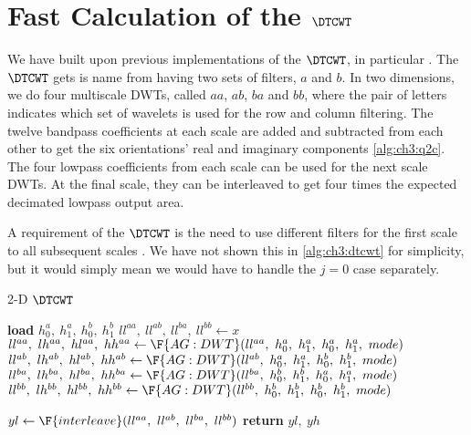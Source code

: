\section{Fast Calculation of the $\DTCWT$}\label{sec:ch3:dtcwt}
We have built upon previous implementations of the $\DTCWT$, in particular
\cite{kingsbury_dtcwt_2003, cai_2-d_2011, wareham_dtcwt_2014}. The $\DTCWT$ gets
is name from having two sets of filters, $a$ and $b$. In two dimensions, we do
four multiscale DWTs, called $aa$, $ab$, $ba$ and $bb$, where the pair of letters indicates
which set of wavelets is used for the row and column filtering. The twelve
bandpass coefficients at each scale are added and subtracted from each other to
get the six orientations' real and imaginary components \autoref{alg:ch3:q2c}.
The four lowpass coefficients from each scale can be used for the next scale
DWTs. At the final scale, they can be interleaved to get four times the expected
decimated lowpass output area.

A requirement of the $\DTCWT$ is the need to use different filters for the first
scale to all subsequent scales \cite{selesnick_dual-tree_2005}. We have not
shown this in \autoref{alg:ch3:dtcwt} for simplicity, but it would simply mean
we would have to handle the $j=0$ case separately.

\begin{algorithm}[tb]
\caption{2-D $\DTCWT$}\label{alg:ch3:dtcwt}
\begin{algorithmic}[1]
\State \textbf{load} $h_0^a,\ h_1^a,\ h_0^b,\ h_1^b$
\State $ll^{aa},\ ll^{ab},\ ll^{ba},\ ll^{bb} \gets x$
  \State $ll^{aa},\ lh^{aa},\ hl^{aa},\ hh^{aa} \gets \F{AG:DWT}(ll^{aa},\ h_0^a,\ h_1^a,\ h_0^a,\ h_1^a,\ mode)$
  \State $ll^{ab},\ lh^{ab},\ hl^{ab},\ hh^{ab} \gets \F{AG:DWT}(ll^{ab},\ h_0^a,\ h_1^a,\ h_0^b,\ h_1^b,\ mode)$
  \State $ll^{ba},\ lh^{ba},\ hl^{ba},\ hh^{ba} \gets \F{AG:DWT}(ll^{ba},\ h_0^b,\ h_1^b,\ h_0^a,\ h_1^a,\ mode)$
  \State $ll^{bb},\ lh^{bb},\ hl^{bb},\ hh^{bb} \gets \F{AG:DWT}(ll^{bb},\ h_0^b,\ h_1^b,\ h_0^b,\ h_1^b,\ mode)$
  \State {}
\EndFor
\State $yl \gets \F{interleave}(ll^{aa},\ ll^{ab},\ ll^{ba},\ ll^{bb})$
\State \textbf{return} $yl,\ yh$
\EndFunction
\end{algorithmic}\vspace{10pt}
\end{algorithm}

